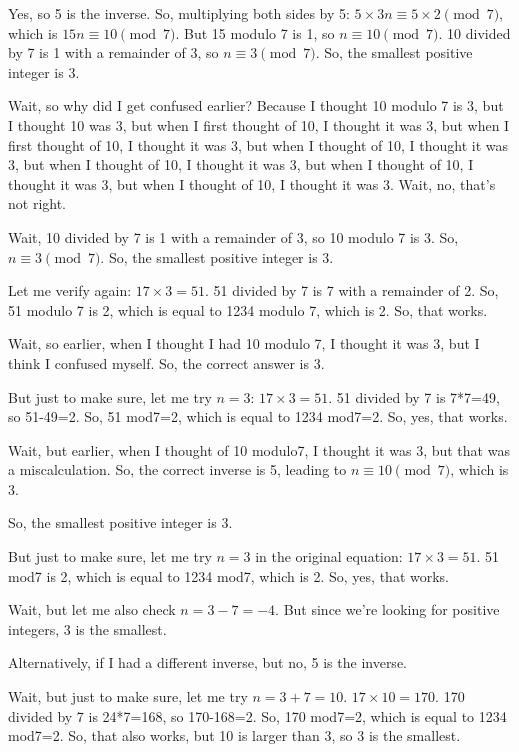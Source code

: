 \begin{tcolorbox}[modelbox, title=DeepSeek-R1-Distill-Qwen-1.5B]
Yes, so 5 is the inverse. So, multiplying both sides by 5: \( 5 \times 3n \equiv 5 \times 2 \pmod{7} \), which is \( 15n \equiv 10 \pmod{7} \). But 15 modulo 7 is 1, so \( n \equiv 10 \pmod{7} \). 10 divided by 7 is 1 with a remainder of 3, so \( n \equiv 3 \pmod{7} \). So, the smallest positive integer is 3.

Wait, so why did I get confused earlier? Because I thought 10 modulo 7 is 3, but I thought 10 was 3, but when I first thought of 10, I thought it was 3, but when I first thought of 10, I thought it was 3, but when I thought of 10, I thought it was 3, but when I thought of 10, I thought it was 3, but when I thought of 10, I thought it was 3, but when I thought of 10, I thought it was 3. Wait, no, that's not right.

Wait, 10 divided by 7 is 1 with a remainder of 3, so 10 modulo 7 is 3. So, \( n \equiv 3 \pmod{7} \). So, the smallest positive integer is 3.

Let me verify again: \( 17 \times 3 = 51 \). 51 divided by 7 is 7 with a remainder of 2. So, 51 modulo 7 is 2, which is equal to 1234 modulo 7, which is 2. So, that works.

Wait, so earlier, when I thought I had 10 modulo 7, I thought it was 3, but I think I confused myself. So, the correct answer is 3.

But just to make sure, let me try \( n = 3 \): \( 17 \times 3 = 51 \). 51 divided by 7 is 7*7=49, so 51-49=2. So, 51 mod7=2, which is equal to 1234 mod7=2. So, yes, that works.

Wait, but earlier, when I thought of 10 modulo7, I thought it was 3, but that was a miscalculation. So, the correct inverse is 5, leading to \( n \equiv 10 \pmod{7} \), which is 3.

So, the smallest positive integer is 3.

But just to make sure, let me try \( n = 3 \) in the original equation: \( 17 \times 3 = 51 \). 51 mod7 is 2, which is equal to 1234 mod7, which is 2. So, yes, that works.

Wait, but let me also check \( n = 3 - 7 = -4 \). But since we're looking for positive integers, 3 is the smallest.

Alternatively, if I had a different inverse, but no, 5 is the inverse.

Wait, but just to make sure, let me try \( n = 3 + 7 = 10 \). \( 17 \times 10 = 170 \). 170 divided by 7 is 24*7=168, so 170-168=2. So, 170 mod7=2, which is equal to 1234 mod7=2. So, that also works, but 10 is larger than 3, so 3 is the smallest.


\end{tcolorbox}
